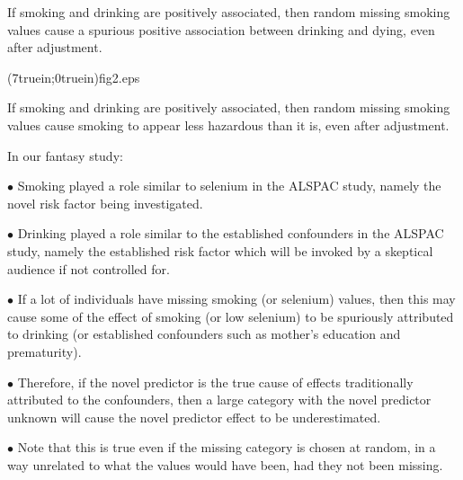 If smoking and drinking are positively associated, then random missing smoking values cause a spurious
positive association between drinking and dying, even after adjustment.

\vfill\eject
\medskip
{}

\medskip

\psboxto(7truein;0truein){fig2.eps}

\medskip

If smoking and drinking are positively associated, then random missing smoking values cause smoking
to appear less hazardous than it is, even after adjustment.
\vfill\eject
\medskip


In our fantasy study:

\beginitems

\item{$\bullet$} Smoking played a role similar to selenium in the ALSPAC study, namely
the novel risk factor being investigated.

\item{$\bullet$} Drinking played a role similar to the established confounders in the
ALSPAC study, namely the established risk factor which will be invoked by a skeptical audience if not controlled for.

\item{$\bullet$} If a lot of individuals have missing smoking (or selenium) values,
then this may cause some of the effect of smoking (or low selenium) to be spuriously attributed to
drinking (or established confounders such as mother's education and prematurity).

\item{$\bullet$} Therefore, if the novel predictor is the true cause of effects traditionally attributed to the confounders,
then a large category with the novel predictor unknown will cause the novel predictor effect to
be underestimated.

\item{$\bullet$} Note that this is true even if the missing category is chosen at random, in a way unrelated
to what the values would have been, had they not been missing.

\enditems

\vfill\eject

\bye
